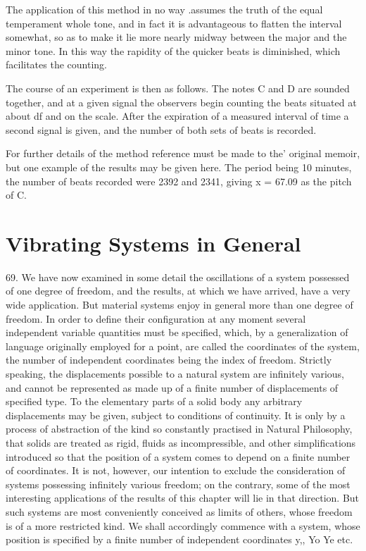 The application of this method in no way .assumes the truth of the equal
temperament whole tone, and in fact it is advantageous to flatten the
interval somewhat, so as to make it lie more nearly midway between the
major and the minor tone. In this way the rapidity of the quicker beats
is diminished, which facilitates the counting.

The course of an experiment is then as follows. The notes C and D are
sounded together, and at a given signal the observers begin counting the
beats situated at about df and on the scale. After the expiration of a
measured interval of time a second signal is given, and the number of both
sets of beats is recorded.

For further details of the method reference must be made to the'
original memoir, but one example of the results may be given here. The
period being 10 minutes, the number of beats recorded were 2392 and
2341, giving x = 67.09 as the pitch of C.
\chapter{Vibrating Systems in General}\label{vibrating-systems-in-general}

69. We have now examined in some detail the oscillations of a system possessed
of one degree of freedom, and the results, at which we have arrived, have a
very wide application. But material systems enjoy in general more than one
degree of freedom. In order to define their configuration at any moment several
independent variable quantities must be specified, which, by a generalization
of language originally employed for a point, are called the coordinates of the
system, the number of independent coordinates being the index of freedom.
Strictly speaking, the displacements possible to a natural system are
infinitely various, and cannot be represented as made up of a finite number of
displacements of specified type. To the elementary parts of a solid body any
arbitrary displacements may be given, subject to conditions of continuity. It
is only by a process of abstraction of the kind so constantly practised in
Natural Philosophy, that solids are treated as rigid, fluids as incompressible,
and other simplifications introduced so that the position of a system comes to
depend on a finite number of coordinates.  It is not, however, our intention to
exclude the consideration of systems possessing infinitely various freedom; on
the contrary, some of the most interesting applications of the results of this
chapter will lie in that direction. But such systems are most conveniently
conceived as limits of others, whose freedom is of a more restricted kind. We
shall accordingly commence with a system, whose position is specified by a
finite number of independent coordinates y,, Yo Ye etc.

